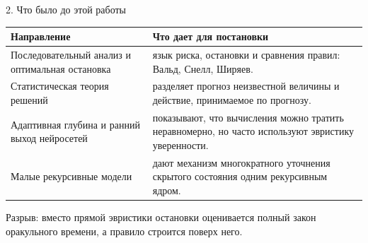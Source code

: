 \documentclass[aspectratio=169,11pt]{beamer}
\newcommand{\smallnote}[1]{{\color{mutedText}\small #1}}
\begin{document}
\begin{frame}{2. Что было до этой работы}
\small
\small\begin{tabularx}{\textwidth}{@{}p{}Y@{}}
\toprule
\textbf{Направление} & \textbf{Что дает для постановки} \\
\midrule
Последовательный анализ и оптимальная остановка & язык риска, остановки и сравнения правил: Вальд, Снелл, Ширяев.\\[1mm]
Статистическая теория решений & разделяет прогноз неизвестной величины и действие, принимаемое по прогнозу.\\[1mm]
Адаптивная глубина и ранний выход нейросетей & показывают, что вычисления можно тратить неравномерно, но часто используют эвристику уверенности.\\[1mm]
Малые рекурсивные модели & дают механизм многократного уточнения скрытого состояния одним рекурсивным ядром.\\
\bottomrule
\end{tabularx}

\vspace{4mm}
\vspace{2mm}
\smallnote{Разрыв: вместо прямой эвристики остановки оценивается полный закон оракульного времени, а правило строится поверх него.}
\end{frame}
\end{document}
